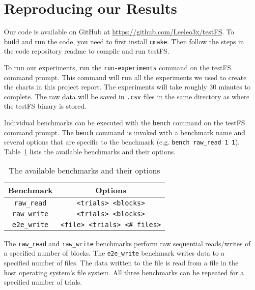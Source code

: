 \section{Reproducing our Results}
Our code is available on GitHub at \url{https://github.com/Leeleo3x/testFS}.
To build and run the code, you need to first install {\tt cmake}. Then
follow the steps in the code repository readme to compile and run testFS.

To run our experiments, run the {\tt run-experiments} command on the testFS
command prompt. This command will run all the experiments we used to create the
charts in this project report. The experiments will take roughly 30 minutes to
complete. The raw data will be saved in {\tt .csv} files in the same directory
as where the testFS binary is stored.

Individual benchmarks can be executed with the {\tt bench} command on the
testFS command prompt. The {\tt bench} command is invoked with a benchmark name
and several options that are specific to the benchmark (e.g. {\tt bench
  raw\_read 1 1}). Table~\ref{tbl:bench-commands} lists the available
benchmarks and their options.

\begin{table}
  \centering
  \caption{The available benchmarks and their options}
  \label{tbl:bench-commands}
  \begin{tabular}{c|c}
    {\bf Benchmark} & {\bf Options} \\ \hline
    {\tt raw\_read} & {\tt <trials> <blocks>} \\ \hline
    {\tt raw\_write} & {\tt <trials> <blocks>} \\ \hline
    {\tt e2e\_write} & {\tt <file> <trials> <\# files>}
  \end{tabular}
\end{table}

The {\tt raw\_read} and {\tt raw\_write} benchmarks perform raw sequential
reads/writes of a specified number of blocks. The {\tt e2e\_write} benchmark
writes data to a specified number of files. The data written to the file is
read from a file in the host operating system's file system. All three
benchmarks can be repeated for a specified number of trials.
